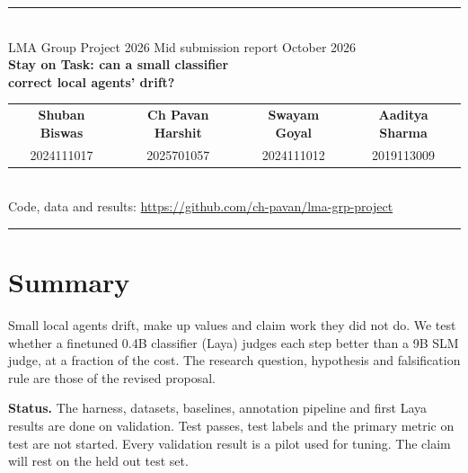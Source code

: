 \documentclass[10pt,a4paper]{article}
\begin{document}
\thispagestyle{plain}
\begin{center}
{\color{rule}\rule{\linewidth}{1.2pt}}\\[4pt]
{\small\sffamily\color{sub}LMA Group Project 2026 \enspace\textperiodcentered\enspace Mid submission report \enspace\textperiodcentered{} October 2026}\\[5pt]
{\sffamily\LARGE\bfseries\color{head} Stay on Task: can a small classifier\\[1pt] correct local agents' drift?}\\[7pt]
\begin{tabular}{cccc}
\textbf{Shuban Biswas} & \textbf{Ch Pavan Harshit} & \textbf{Swayam Goyal} & \textbf{Aaditya Sharma}\\
{\footnotesize 2024111017} & {\footnotesize 2025701057} & {\footnotesize 2024111012} & {\footnotesize 2019113009}
\end{tabular}\\[4pt]
{\footnotesize Code, data and results: \url{https://github.com/ch-pavan/lma-grp-project}}\\[2pt]
{\color{rule}\rule{\linewidth}{0.5pt}}
\end{center}

\section{Summary}
Small local agents drift, make up values and claim work they did not do. We test whether a finetuned 0.4B classifier (Laya) judges each step better than a 9B SLM judge, at a fraction of the cost. The research question, hypothesis and falsification rule are those of the revised proposal.

\textbf{Status.} The harness, datasets, baselines, annotation pipeline and first Laya results are done on validation. Test passes, test labels and the primary metric on test are not started. Every validation result is a pilot used for tuning. The claim will rest on the held out test set.
\end{document}
